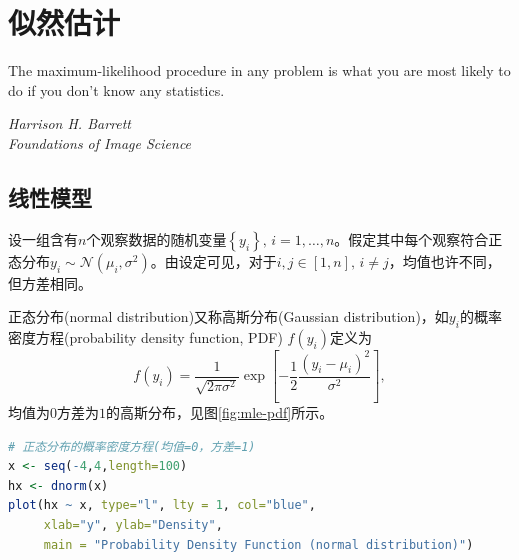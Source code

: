 \chapter{似然估计}
\label{sec:mle-model}

\epigraph{The maximum-likelihood procedure in any problem is what you are most likely to do if you don’t know any statistics.}{\textit{Harrison H. Barrett \\ Foundations of Image Science}}

\section{线性模型}
\label{sec:linear-model}

设一组含有$n$个观察数据的随机变量$\left\{ y_{i} \right\}, \, i = 1,\ldots,n$。假定其中每个观察符合正态分布$y_{i} \sim \mathcal{N} \left( \mu_{i}, \sigma^{2} \right)$。由设定可见，对于$i,j \in [1,n], \, i \neq j$，均值也许不同，但方差相同。

正态分布(normal distribution)又称高斯分布(Gaussian distribution)，如$y_{i}$的概率密度方程(probability density function, PDF) $f\left( y_{i} \right)$定义为
\begin{equation}
  \label{eq:mle-pdf-def}
  f \left( y_{i} \right) = \frac{1}{\sqrt{2 \pi \sigma^{2}}}
  \exp \left[
  - \frac{1}{2} \frac{
  \left( y_{i} - \mu_{i} \right)^{2}
  }{
  \sigma^{2}
  }
   \right],
\end{equation}
均值为$0$方差为$1$的高斯分布，见图\ref{fig:mle-pdf}所示。

\begin{lstlisting}[language=R]
# 正态分布的概率密度方程(均值=0，方差=1)
x <- seq(-4,4,length=100)
hx <- dnorm(x)
plot(hx ~ x, type="l", lty = 1, col="blue",
     xlab="y", ylab="Density",
     main = "Probability Density Function (normal distribution)")
\end{lstlisting}

